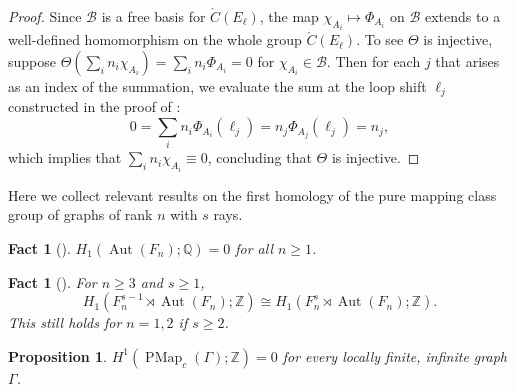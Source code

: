 \documentclass[11pt]{amsart}
\theoremstyle{plain}
\newtheorem{PROP}[THM]{Proposition}
\newtheorem{FACT}[THM]{Fact}
\theoremstyle{definition}
\DeclareMathOperator{\Aut}{Aut}
\DeclareMathOperator{\PMap}{PMap}
\newcommand{\Z}{\mathbb{Z}}
\def\G{{\Gamma}}
\newcommand{\<}{\langle}
\renewcommand{\>}{\rangle}
\newcommand{\dC}{\mathring{C}}
\begin{document}
\begin{proof}
    Since $\mathcal{B}$ is a free basis for $\dC(E_\ell)$, the map $\chi_{A_i} \mapsto \Phi_{A_i}$ on $\mathcal{B}$ extends to a well-defined homomorphism on the whole group $\dC(E_\ell)$. To see $\Theta$ is injective, suppose $\Theta(\sum_i
    n_i\chi_{A_i}) = \sum_i n_i\Phi_{A_i} =0$ for $\chi_{A_i} \in
    \mathcal{B}$. 
    Then for each $j$ that arises as an index of the summation, we evaluate the sum at the loop shift $\ell_j$ constructed in the proof of :
    \[
        0 = \sum_i n_i \Phi_{A_i}(\ell_j) = n_j\Phi_{A_j}(\ell_j) = n_j,
    \]
    which implies that $\sum_i n_i\chi_{A_i} \equiv 0$, concluding that $\Theta$ is injective.
\end{proof}

Here we collect relevant results on the first homology of the pure mapping class group of graphs of rank $n$ with $s$ rays.

\begin{FACT}[{\cite[Theorem 1.1]{HV1998}}]
    \label{fact:TrivialRationalCohomology}
    $H_1(\Aut(F_n);\mathbb{Q})=0$ for all $n \ge 1$.
\end{FACT}

\begin{FACT}[{\cite[Section 4]{Hatcher1995}}]
    \label{fact:ThornedRoseCohomology}
    For $n \ge 3$ and $s \ge 1$,
    \[
    H_1(F_n^{s-1} \rtimes \Aut(F_n);\Z) \cong  H_1(F_n^{s} \rtimes \Aut(F_n);\Z).
    \]
    This still holds for $n=1,2$ if $s \ge 2$.
\end{FACT}

\begin{PROP}
  \label{prop:h1PmapcZero}
  $H^1(\PMap_c(\G);\Z)=0$ for every locally finite, infinite graph $\G$.
  \end{PROP}
\end{document}
